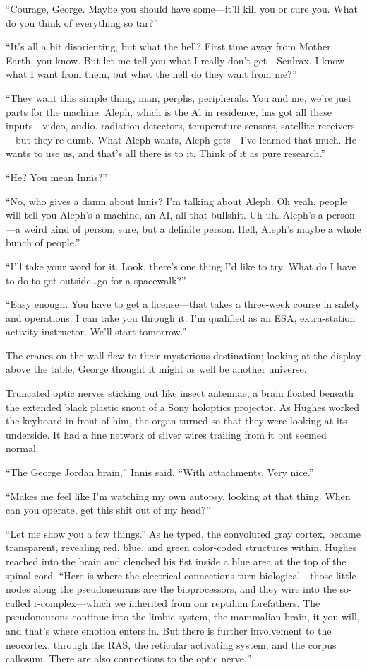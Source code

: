 ``Courage, George. Maybe you should have some—it'll kill you or cure you. What do you think of everything so tar?''

``It's all a bit disorienting, but what the hell? First time away from Mother Earth, you know. But let me tell you what I really don't get—Senlrax. I know what I want from them, but what the hell do they want from me?''

``They want this simple thing, man, perphs, peripherals. You and me, we're just parts for the machine. Aleph, which is the Al in residence, has got all these inputs—video, audio. radiation detectors, temperature sensors, satellite receivers—but they're dumb. What Aleph wants, Aleph gets—I've learned that much. He wants to use us, and that's all there is to it. Think of it as pure research.''

``He? You mean Innis?''

``No, who gives a damn about lnnis? I'm talking about Aleph. Oh yeah, people will tell you Aleph's a machine, an AI, all that bullshit. Uh-uh. Aleph's a person—a weird kind of person, sure, but a definite person. Hell, Aleph's maybe a whole bunch of people.''

``I'll take your word for it. Look, there's one thing I'd like to try. What do I have to do to get outside\ldots go for a spacewalk?''

``Easy enough. You have to get a license—that takes a three-week course in safety and operations. I can take you through it. I'm qualified as an ESA, extra-station activity instructor. We'll start tomorrow.''

The cranes on the wall flew to their mysterious destination; looking at the display above the table, George thought it might as well be another universe.

Truncated optic nerves sticking out like insect antennae, a brain floated beneath the extended black plastic snout of a Sony holoptics projector. As Hughes worked the keyboard in front of him, the organ turned so that they were looking at its underside. It had a fine network of silver wires trailing from it but seemed normal.

``The George Jordan brain,'' Innis said. ``With attachments. Very nice.''

``Makes me feel like I'm watching my own autopsy, looking at that thing. When can you operate, get this shit out of my head?''

``Let me show you a few things.'' As he typed, the convoluted gray cortex, became transparent, revealing red, blue, and green color-coded structures within. Hughes reached into the brain and clenched his fist inside a blue area at the top of the spinal cord. ``Here is where the electrical connections turn biological—those little nodes along the pseudoneurans are the bioprocessors, and they wire into the so-called r-complex—which we inherited from our reptilian forefathers. The pseudoneurons continue into the limbic system, the mammalian brain, it you will, and that's where emotion enters in. But there is further involvement to the neocortex, through the RAS, the reticular activating system, and the corpus callosum. There are also connections to the optic nerve,''

